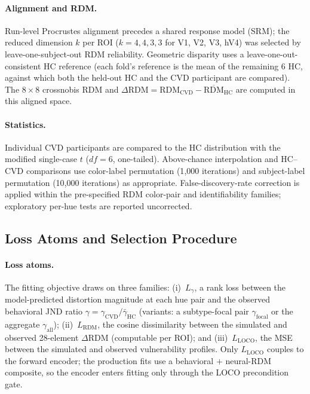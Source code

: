 \documentclass{article}
\begin{document}
\paragraph{Alignment and RDM.}
Run-level Procrustes alignment precedes a shared response model (SRM); the reduced dimension $k$ per ROI ($k = 4, 4, 3, 3$ for V1, V2, V3, hV4) was selected by leave-one-subject-out RDM reliability.
Geometric disparity uses a leave-one-out-consistent HC reference (each fold's reference is the mean of the remaining 6 HC, against which both the held-out HC and the CVD participant are compared).
The $8\times 8$ crossnobis RDM and $\Delta\text{RDM} = \text{RDM}_{\text{CVD}} - \overline{\text{RDM}}_{\text{HC}}$ are computed in this aligned space.

\paragraph{Statistics.}
Individual CVD participants are compared to the HC distribution with the \citet{crawford1998} modified single-case $t$ ($df = 6$, one-tailed). Above-chance interpolation and HC--CVD comparisons use color-label permutation (1{,}000 iterations) and subject-label permutation (10{,}000 iterations) as appropriate. False-discovery-rate correction is applied within the pre-specified RDM color-pair and identifiability families; exploratory per-hue tests are reported uncorrected.

\subsection{Loss Atoms and Selection Procedure}
\label{app:selection}

\paragraph{Loss atoms.}
The fitting objective draws on three families: (i)~$L_\gamma$, a rank loss between the model-predicted distortion magnitude at each hue pair and the observed behavioral JND ratio $\gamma = \gamma_{\text{CVD}}/\bar\gamma_{\text{HC}}$ (variants: a subtype-focal pair $\gamma_{\text{focal}}$ or the aggregate $\gamma_{\text{all}}$); (ii)~$L_{\text{RDM}}$, the cosine dissimilarity between the simulated and observed 28-element $\Delta$RDM (computable per ROI); and (iii)~$L_{\text{LOCO}}$, the MSE between the simulated and observed vulnerability profiles. Only $L_{\text{LOCO}}$ couples to the forward encoder; the production fits use a behavioral $+$ neural-RDM composite, so the encoder enters fitting only through the LOCO precondition gate.
\end{document}
